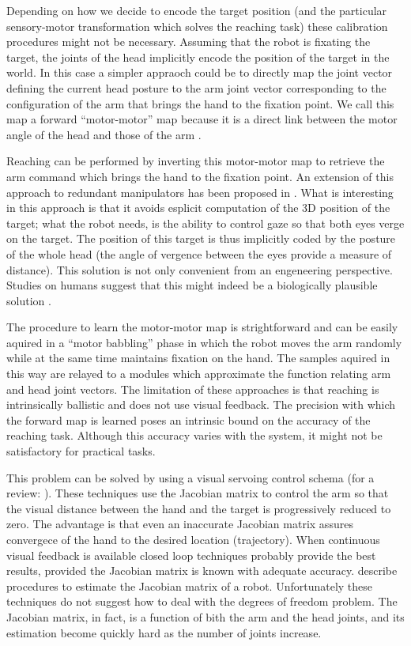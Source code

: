Depending on how we decide to encode the target position (and the 
particular sensory-motor transformation which solves the reaching task)
these calibration procedures might not be necessary. Assuming that 
the robot is fixating the target, the joints of the head implicitly 
encode the position of the target in the world. In this case a simpler 
appraoch could be to directly map the joint vector defining the current 
head posture to the arm joint vector corresponding to the configuration 
of the arm that brings the hand to the fixation point. We call this map 
a forward ``motor-motor'' map because it is a direct link between the motor 
angle of the head and those of the arm 
\cite{blackburn94learning,metta99developmental}. 

Reaching can be performed by inverting this motor-motor 
map to retrieve the arm command which brings the hand to the fixation 
point. An extension of this approach to redundant manipulators has
been proposed in \cite{lopes06learning}. What is interesting in this 
approach is that it avoids esplicit computation of the 3D position 
of the target; what the robot needs, is the ability to control gaze
so that both eyes verge on the target. The position of 
this target is thus implicitly coded by the posture of the whole head (the 
angle of vergence between the eyes provide a measure of distance). 
This solution is not only convenient from an engeneering perspective. Studies 
on humans suggest that this might indeed be a biologically plausible 
solution \cite{flanders-daghestani-berthoz-1999}.

The procedure to learn the motor-motor map is strightforward and can be 
easily aquired in a ``motor babbling'' phase in which the robot moves 
the arm randomly while at the same time maintains fixation on the hand. 
The samples aquired in this way are relayed to a modules which 
approximate the function relating arm and head joint vectors. The 
limitation of these approaches is that reaching
is intrinsically ballistic and does not use visual feedback. The precision 
with which the forward map is learned poses an intrinsic bound on
the accuracy of the reaching task. Although this accuracy varies with the
system, it might not be satisfactory for practical tasks.

This problem can be solved by using a visual servoing control schema (for a 
review: \cite{hutchinson96tutorial}). These techniques use the 
Jacobian matrix to control the arm so that the visual distance between the 
hand and the target is progressively reduced to zero. The advantage is that 
even an inaccurate Jacobian matrix assures convergece 
of the hand to the desired location (trajectory). When continuous visual 
feedback is available closed loop techniques probably provide the best 
results, provided the Jacobian matrix is known with 
adequate accuracy. \cite{Hosoda94versatile,Mansard06jacobian,Lapreste04efficient} 
describe procedures to estimate the Jacobian matrix of a robot. Unfortunately 
these techniques do not suggest how to deal with the 
degrees of freedom problem. The Jacobian matrix, in fact, is a function
of bith the arm and the head joints, and its estimation become 
quickly hard as the number of joints increase.

